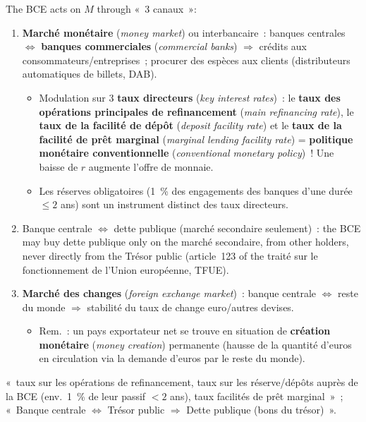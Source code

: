 The BCE acts on $M$ through «~3 canaux~»:
\begin{enumerate}
  \item \textbf{Marché monétaire} (\textit{money market}) ou interbancaire~:
    banques centrales $\Leftrightarrow$ \textbf{banques commerciales}
    (\textit{commercial banks}) $\Rightarrow$ crédits aux
    consommateurs/entreprises~; procurer des espèces aux clients (distributeurs
    automatiques de billets, DAB).
    \begin{itemize}
      \item Modulation sur 3 \textbf{taux directeurs} (\textit{key interest
        rates})~: le \textbf{taux des opérations principales de refinancement}
        (\textit{main refinancing rate}), le \textbf{taux de la facilité de
        dépôt} (\textit{deposit facility rate}) et le \textbf{taux de la
        facilité de prêt marginal} (\textit{marginal lending facility rate}) =
        \textbf{politique monétaire conventionnelle} (\textit{conventional
        monetary policy})~! Une baisse de $r$ augmente l'offre de monnaie.
      \item Les réserves obligatoires (1~\% des engagements des banques d'une
        durée $\le 2$ ans) sont un instrument distinct des taux directeurs.
    \end{itemize}
  \item Banque centrale $\Leftrightarrow$ dette publique (marché secondaire
    seulement)~: the BCE may buy dette publique only on the marché secondaire,
    from other holders, never directly from the Trésor public (article~123 of the
    traité sur le fonctionnement de l'Union européenne, TFUE).
  \item \textbf{Marché des changes} (\textit{foreign exchange market})~: banque
    centrale $\Leftrightarrow$ reste du monde $\Rightarrow$ stabilité du taux de
    change euro/autres devises.
    \begin{itemize}
      \item Rem.~: un pays exportateur net se trouve en situation de
        \textbf{création monétaire} (\textit{money creation}) permanente (hausse
        de la quantité d'euros en circulation via la demande d'euros par le reste
        du monde).
    \end{itemize}
\end{enumerate}

\begin{remark}
  «~taux sur les opérations de refinancement, taux sur les réserve/dépôts auprès
  de la BCE (env.\ 1~\% de leur passif $< 2$ ans), taux facilités de prêt
  marginal~»~; «~Banque centrale $\Leftrightarrow$ Trésor public $\Rightarrow$
  Dette publique (bons du trésor)~».
\end{remark}

